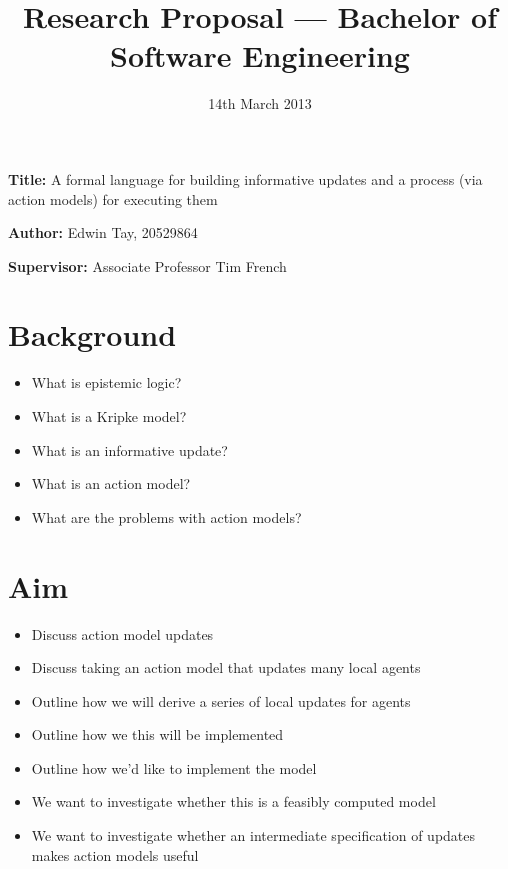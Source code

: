 \documentclass[12pt, a4paper]{article}
\title{Research Proposal --- Bachelor of Software Engineering}
\date{14th March 2013}
\newcommand{\namelistlabel}[1]{\mbox{#1}\hfil}
\newenvironment{namelist}[1]{%
\begin{list}{}
    {
        \let\makelabel\namelistlabel
        \settowidth{\labelwidth}{#1}
        \setlength{\leftmargin}{1.1\labelwidth}
    }
  }{%
\end{list}}
\begin{document}
\maketitle

\begin{namelist}{}
\item[{\bf Title:}]
	A formal language for building informative updates and a process (via
  action models) for executing them
  \item[{\bf Author:}]
	Edwin Tay, 20529864
\item[{\bf Supervisor:}]
	Associate Professor Tim French
\end{namelist}

\section*{Background}

\begin {itemize}
  \item What is epistemic logic?
  \item What is a Kripke model?
  \item What is an informative update?
  \item What is an action model?
  \item What are the problems with action models?
\end {itemize}

\section*{Aim}

\begin{itemize}
  \item Discuss action model updates
  \item Discuss taking an action model that updates many local agents
  \item Outline how we will derive a series of local updates for agents
  \item Outline how we this will be implemented
  \item Outline how we'd like to implement the model
  \item We want to investigate whether this is a feasibly computed model
  \item We want to investigate whether an intermediate specification of updates
    makes action models useful
\end{itemize}
 
\end{document}
